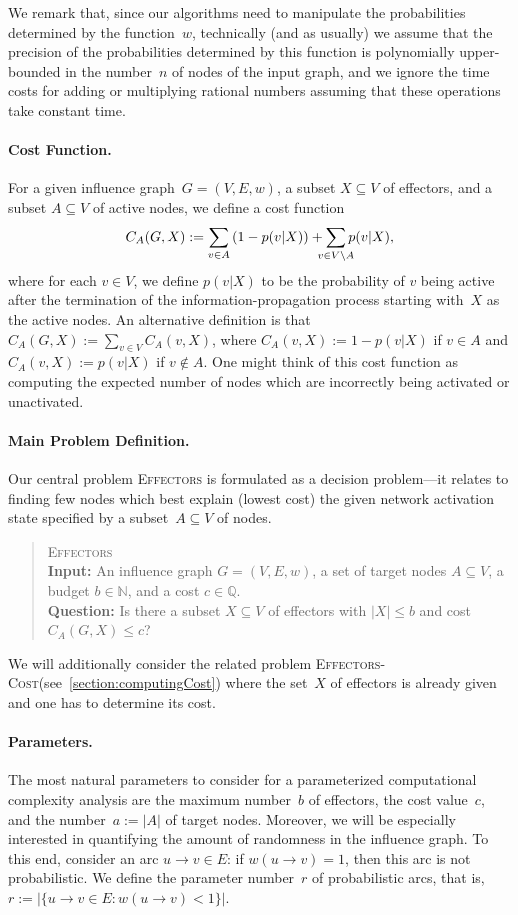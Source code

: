 \documentclass{article}
\newcommand{\N}{{\mathbb{N}}}
\newcommand{\Q}{{\mathbb{Q}}}
\newcommand{\probDef}[3]{
  \begin{quote}
    #1 \\
    \textbf{Input:} #2 \\
    \textbf{Question:} #3
  \end{quote}
}
\newcommand{\probEffectors}{\textsc{Effectors}\xspace}
\newcommand{\probCost}{\textsc{Effectors-Cost}\xspace}
\begin{document}
We remark that,
since our algorithms need to manipulate the probabilities determined by the function~$w$,
technically (and as usually)
we assume that the precision of the probabilities determined by this function 
is polynomially upper-bounded in the number~$n$ of nodes of the input graph,
and we ignore the time costs for adding or multiplying rational numbers assuming that these operations take constant time.



\paragraph{Cost Function.}
For a given influence graph~$G=(V,E,w)$,
a subset $X \subseteq V$ of effectors,
and a subset $A \subseteq V$ of active nodes,
we define a cost function
\[
  C_A(G,X) := \sum_{v \in A}\left(1-p(v|X)\right)+\smashoperator{\sum_{v \in V\setminus A}}p(v|X),
\]
where for each $v \in V$, we define $p(v|X)$ to be the probability of
$v$ being active after the termination of the information-propagation process starting
with~$X$ as the active nodes.
An alternative definition is that $C_A(G,X) := \sum_{v \in V} C_A(v,X)$,
where $C_A(v,X) := 1 - p(v|X)$ if $v \in A$ and $C_A(v,X) := p(v|X)$ if $v \notin A$.
One might think of this cost function as computing the expected number of nodes
which are incorrectly being activated or unactivated.


\paragraph{Main Problem Definition.}
Our central problem \probEffectors is formulated as a decision problem---it 
relates to finding few nodes which best explain (lowest cost) the given 
network activation state specified by a subset~$A\subseteq V$ of nodes.
\probDef
  {\probEffectors}
  {An influence graph $G = (V, E, w)$, a set of target nodes $A \subseteq V$, a budget $b \in \N$, and a cost $c \in \Q$.}
  {Is there a subset $X \subseteq V$ of effectors with $|X| \leq b$ and cost $C_A(G,X) \leq c$?}
We will additionally consider the related problem 
\probCost (see~\autoref{section:computingCost}) where the set~$X$ 
of effectors 
is already given and one has to determine its cost.

\paragraph{Parameters.}
The most natural parameters to consider for a parameterized computational complexity 
analysis are the maximum number~$b$ of
effectors, the cost value~$c$, and the number~$a:=|A|$ of target nodes.
Moreover, we will be especially interested in quantifying the amount of
randomness in the influence graph.
To this end, consider an arc $u \to v\in E$:
if $w(u \to v)= 1$,
then this arc is not probabilistic.
We define the parameter number~$r$ of probabilistic arcs, that is,
$r:= |\{u \to v\in E : w(u \to v) < 1\}|$.
\end{document}
